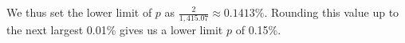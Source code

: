 We thus set the lower limit of $p$ as $\frac{2}{1,415.07} \approx 0.1413\%$. Rounding this value up to the next largest 0.01\% gives us a lower limit $p$ of 0.15\%.\endinput